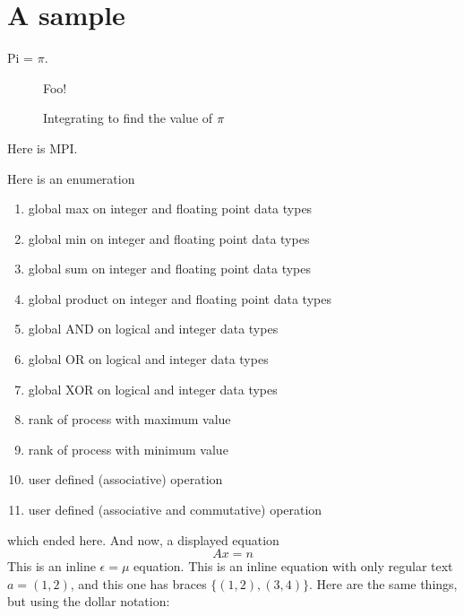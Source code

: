 \documentclass{article}
\newcommand{\commentOut}[1]{{}}
\def\MPI/{MPI}
\begin{document}
\section{A sample}\label{Sample-doc}

Pi = \( \pi \).

\begin{figure}[htbp]
    \centerline{Foo!}
    \caption{Integrating to find the value of \protect\( \pi \protect\)}
    \label{fig:pi}
\end{figure}

Here is \MPI/.
\commentOut{
\begin{verbatim}
           First Execution

    0             1               2
                        /-----  send
                recv <-/
broadcast     broadcast       broadcast
  send ---\
           \--> recv
\end{verbatim}

\begin{verbatim}
           Second Execution

   0              1               2
broadcast
  send ---\
           \-->  recv
               broadcast       broadcast
                           /---  send
                 recv <---/
\end{verbatim}
} %

Here is an enumeration
\begin{enumerate}
\item[] global max on integer and floating point data types
\item[] global min on integer and floating point data types
\item[] global sum on integer and floating point data types
\item[] global product on integer and floating point data types
\item[] global AND on logical and integer data types
\item[] global OR on logical and integer data types
\item[] global XOR on logical and integer data types
\item[] rank of process with maximum value
\item[] rank of process with minimum value
\item[] user defined (associative) operation
\item[] user defined (associative and commutative) operation
\end{enumerate}
which ended here.  And now, a displayed equation
\[
A x = n
\]
This is an inline \( \epsilon = \mu \) equation.  This is an inline equation
with only regular text \( a = ( 1,2 ) \), and this one has braces \( \{ (1,2),
(3,4)\} \).  Here are the same things, but using the dollar notation:
\end{document}
